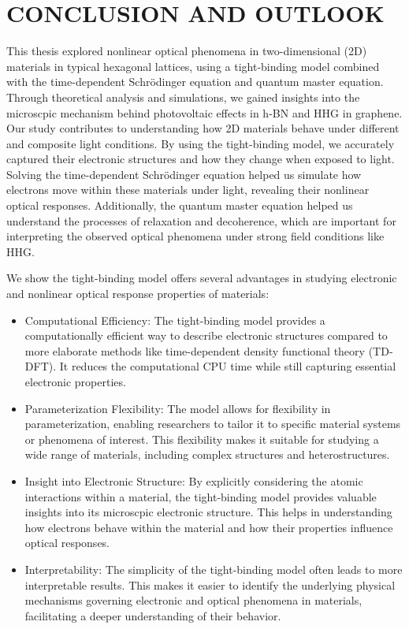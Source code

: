 \chapter{CONCLUSION AND OUTLOOK \label{ch:ch6}}


This thesis explored nonlinear optical phenomena in two-dimensional (2D) materials in typical hexagonal lattices, using a tight-binding model combined with the time-dependent Schrödinger equation and quantum master equation. Through theoretical analysis and simulations, we gained insights into the microscpic mechanism behind photovoltaic effects in \gls{h-BN} and HHG in graphene. Our study contributes to understanding how 2D materials behave under different and composite light conditions. By using the tight-binding model, we accurately captured their electronic structures and how they change when exposed to light. Solving the time-dependent Schrödinger equation helped us simulate how electrons move within these materials under light, revealing their nonlinear optical responses. Additionally, the quantum master equation helped us understand the processes of relaxation and decoherence, which are important for interpreting the observed optical phenomena under strong field conditions like \gls{HHG}.

We show the tight-binding model offers several advantages in studying electronic and nonlinear optical response properties of materials:
\begin{itemize}
	\item Computational Efficiency: The tight-binding model provides a computationally efficient way to describe electronic structures compared to more elaborate methods like time-dependent density functional theory (TD-DFT). It reduces the computational CPU time while still capturing essential electronic properties.

	\item Parameterization Flexibility: The model allows for flexibility in parameterization, enabling researchers to tailor it to specific material systems or phenomena of interest. This flexibility makes it suitable for studying a wide range of materials, including complex structures and heterostructures.

	\item Insight into Electronic Structure: By explicitly considering the atomic interactions within a material, the tight-binding model provides valuable insights into its microscpic electronic structure. This helps in understanding how electrons behave within the material and how their properties influence optical responses.

	\item Interpretability: The simplicity of the tight-binding model often leads to more interpretable results. This makes it easier to identify the underlying physical mechanisms governing electronic and optical phenomena in materials, facilitating a deeper understanding of their behavior.
\end{itemize}

